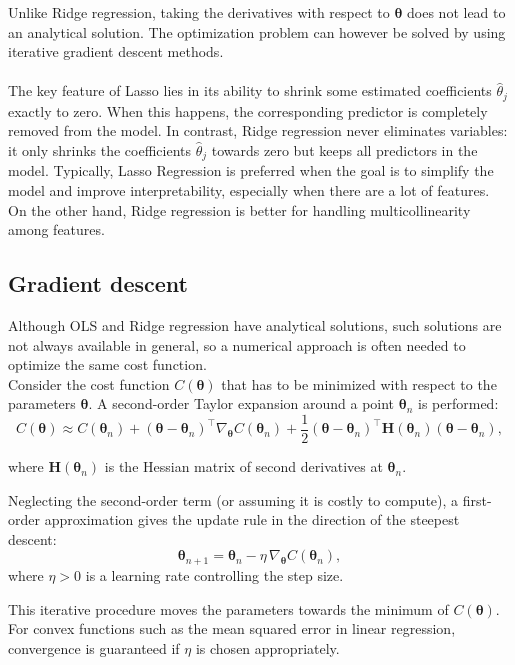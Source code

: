 \documentclass[
 reprint,            %
 amsmath,amssymb,
 aps,
]{revtex4-2}
\begin{document}
Unlike Ridge regression, taking the derivatives with respect to $\boldsymbol{\theta}$ does not lead to an analytical solution. 
The optimization problem can however be solved by using iterative gradient descent methods.\\ \\
The key feature of Lasso lies in its ability to shrink some estimated coefficients $\hat{\theta}_j$ exactly to zero. 
When this happens, the corresponding predictor is completely removed from the model.  
In contrast, Ridge regression never eliminates variables: it only shrinks the coefficients $\hat{\theta}_j$ towards zero but keeps all predictors in the model.
Typically, Lasso Regression is preferred when the goal is to simplify the model and improve interpretability, especially when there are a lot of features. On the other hand, Ridge regression is better for handling multicollinearity among features. 


\subsection{Gradient descent}

Although OLS and Ridge regression have analytical solutions, such solutions are not always available in general, so a numerical approach is often needed to optimize the same cost function.\\

Consider the cost function $C(\boldsymbol{\theta})$ that has to be minimized with respect to the parameters $\boldsymbol{\theta}$.  
A second-order Taylor expansion around a point $\boldsymbol{\theta}_n$ is performed:
$$
C(\boldsymbol{\theta}) \approx C(\boldsymbol{\theta}_n) + (\boldsymbol{\theta}-\boldsymbol{\theta}_n)^\top \nabla_{\boldsymbol{\theta}} C(\boldsymbol{\theta}_n) 
+ \frac{1}{2} (\boldsymbol{\theta}-\boldsymbol{\theta}_n)^\top \mathbf{H}(\boldsymbol{\theta}_n) (\boldsymbol{\theta}-\boldsymbol{\theta}_n),
$$

where $\mathbf{H}(\boldsymbol{\theta}_n)$ is the Hessian matrix of second derivatives at $\boldsymbol{\theta}_n$.

Neglecting the second-order term (or assuming it is costly to compute), a first-order approximation gives the update rule in the direction of the steepest descent:
\[
\boldsymbol{\theta}_{n+1} = \boldsymbol{\theta}_n - \eta \, \nabla_{\boldsymbol{\theta}} C(\boldsymbol{\theta}_n),
\]
where $\eta > 0$ is a learning rate controlling the step size.  

This iterative procedure moves the parameters towards the minimum of $C(\boldsymbol{\theta})$. For convex functions such as the mean squared error in linear regression, convergence is guaranteed if $\eta$ is chosen appropriately.
\end{document}
